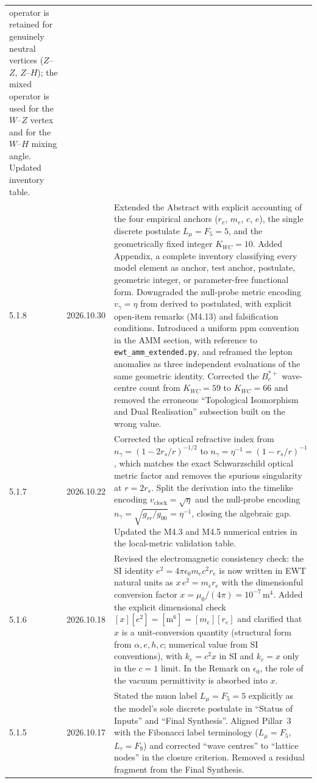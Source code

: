 \documentclass[10pt,a4paper]{article}
\begin{document}
\begin{longtable}{@{}p{1.6cm}p{1.8cm}p{10.1cm}@{}}
	operator is retained for genuinely neutral vertices ($Z$--$Z$,
	$Z$--$H$); the mixed operator is used for the $W$--$Z$ vertex and
	for the $W$--$H$ mixing angle. Updated inventory table. \\
	5.1.8 & 2026.10.30 &
	Extended the Abstract with explicit accounting of the four empirical
	anchors ($r_e$, $m_e$, $c$, $e$), the single discrete postulate
	$L_\mu = F_5 = 5$, and the geometrically fixed integer $K_{WC} = 10$.
	Added Appendix, a complete inventory
	classifying every model element as anchor, test anchor, postulate,
	geometric integer, or parameter-free functional form. Downgraded
	the null-probe metric encoding $v_\gamma = \eta$ from derived to
	postulated, with explicit open-item remarks (M4.13) and falsification
	conditions. Introduced a uniform ppm convention in the AMM section,
	with reference to \texttt{ewt\_amm\_extended.py}, and reframed the
	lepton anomalies as three independent evaluations of the same
	geometric identity. Corrected the $B_c^{*+}$ wave-centre count from
	$K_{WC}=59$ to $K_{WC}=66$ and removed the erroneous ``Topological
	Isomorphism and Dual Realisation'' subsection built on the wrong
	value.\\
	5.1.7 & 2026.10.22 &
	Corrected the optical refractive index from
	$n_\gamma = (1-2r_s/r)^{-1/2}$ to $n_\gamma = \eta^{-1} = (1-r_s/r)^{-1}$,
	which matches the exact Schwarzschild optical metric factor and removes
	the spurious singularity at $r = 2r_s$. Split the derivation into the
	timelike encoding $v_{\text{clock}} = \sqrt{\eta}$ and the null-probe
	encoding $n_\gamma = \sqrt{g_{rr}/g_{00}} = \eta^{-1}$, closing the
	algebraic gap. Updated the M4.3 and M4.5 numerical entries in the
	local-metric validation table. \\
	\midrule
	
	5.1.6 & 2026.10.18 &
	Revised the electromagnetic consistency check: the SI
	identity $e^2 = 4\pi\epsilon_0 m_e c^2 r_e$ is now written in EWT
	natural units as $x\, e^2 = m_e r_e$ with the dimensionful
	conversion factor $x = \mu_0/(4\pi) = 10^{-7}\,\text{m}^4$. Added
	the explicit dimensional check $[x][e^2] = [\text{m}^6] = [m_e][r_e]$
	and clarified that $x$ is a unit-conversion quantity (structural
	form from $\alpha, e, h, c$; numerical value from SI conventions),
	with $k_e = c^2 x$ in SI and $k_e = x$ only in the $c=1$ limit. In
	the Remark on $\epsilon_0$, the role of the vacuum permittivity is
	absorbed into $x$. \\
	\midrule
	
	5.1.5 & 2026.10.17 &
	Stated the muon label $L_\mu = F_5 = 5$ explicitly as the model's
	sole discrete postulate in ``Status of Inputs'' and ``Final
	Synthesis''. Aligned Pillar~3 with the Fibonacci label terminology
	($L_\mu = F_5$, $L_\tau = F_9$) and corrected ``wave centres'' to
	``lattice nodes'' in the closure criterion. Removed a residual
	fragment from the Final Synthesis. \\
	\midrule
	

\end{longtable}
\end{document}
